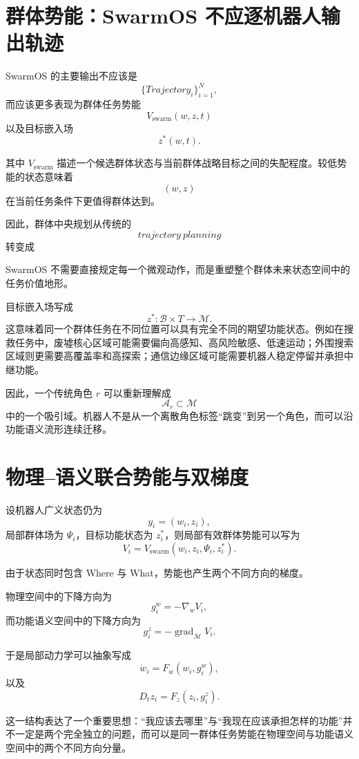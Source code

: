 \section{群体势能：SwarmOS 不应逐机器人输出轨迹}

SwarmOS 的主要输出不应该是
\[
\{Trajectory_i\}_{i=1}^{N},
\]
而应该更多表现为群体任务势能
\[
V_{\mathrm{swarm}}(w,z,t)
\]
以及目标嵌入场
\[
z^*(w,t).
\]

其中 $V_{\mathrm{swarm}}$ 描述一个候选群体状态与当前群体战略目标之间的失配程度。较低势能的状态意味着
\[
(w,z)
\]
在当前任务条件下更值得群体达到。

因此，群体中央规划从传统的
\[
trajectory\ planning
\]
转变成
\begin{statementbox}
\centering
{}
\end{statementbox}
SwarmOS 不需要直接规定每一个微观动作，而是重塑整个群体未来状态空间中的任务价值地形。

目标嵌入场写成
\[
z^*:
\mathcal B\times T
\rightarrow
\mathcal M.
\]
这意味着同一个群体任务在不同位置可以具有完全不同的期望功能状态。例如在搜救任务中，废墟核心区域可能需要偏向高感知、高风险敏感、低速运动；外围搜索区域则更需要高覆盖率和高探索；通信边缘区域可能需要机器人稳定停留并承担中继功能。

因此，一个传统角色 $r$ 可以重新理解成
\[
\mathcal A_r
\subset
\mathcal M
\]
中的一个吸引域。机器人不是从一个离散角色标签“跳变”到另一个角色，而可以沿功能语义流形连续迁移。


\section{物理--语义联合势能与双梯度}

设机器人广义状态仍为
\[
y_i
=
(w_i,z_i),
\]
局部群体场为 $\Psi_i$，目标功能状态为 $z_i^*$，则局部有效群体势能可以写为
\[
V_i
=
V_{\mathrm{swarm}}
(
w_i,
z_i,
\Psi_i,
z_i^*
).
\]

由于状态同时包含 Where 与 What，势能也产生两个不同方向的梯度。

物理空间中的下降方向为
\[
g_i^w
=
-\nabla_wV_i,
\]
而功能语义空间中的下降方向为
\[
g_i^z
=
-\operatorname{grad}_{\mathcal M}V_i.
\]

于是局部动力学可以抽象写成
\[
\dot w_i
=
F_w(w_i,g_i^w),
\]
以及
\[
D_tz_i
=
F_z(z_i,g_i^z).
\]

这一结构表达了一个重要思想：“我应该去哪里”与“我现在应该承担怎样的功能”并不一定是两个完全独立的问题，而可以是同一群体任务势能在物理空间与功能语义空间中的两个不同方向分量。

